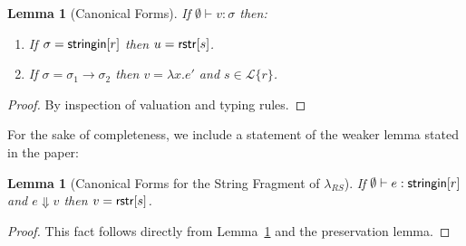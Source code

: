\documentclass[11pt,leqno]{article}
\newtheorem{trlem}[tr]{Lemma}
\newtheorem{lem}[thm]{Lemma}
\theoremstyle{definition}
\newcommand{\Lagr}{\mathcal{L}}
\newcommand{\lang}[1]{\Lagr\{#1\}}
\newcommand{\lambdas}{\lambda_{RS}}
\newcommand{\stringin}[1]{{\sf stringin}[#1]}
\newcommand{\sreduces}{ \Downarrow }
\begin{document}
\begin{trlem}[Canonical Forms]\label{cfgen}
If $\emptyset \vdash v : \sigma$ then:
\begin{enumerate}
\item If $\sigma = \stringin{r}$ then $u = {\sf rstr}[s]$.
\item If $\sigma = \sigma_1 \rightarrow \sigma_2$ then $v = \lambda x . e'$ and $s \in \lang{r}$.
\end{enumerate}

\end{trlem}
\begin{proof}
By inspection of valuation and typing rules.
\end{proof}

For the sake of completeness, we include a statement of the weaker lemma
stated in the paper:

\begin{lem}[Canonical Forms for the String Fragment of $\lambdas$]\label{thm:cfs}
  If $\emptyset \vdash e : \stringin{r}$ and $e \sreduces v$ then $v={\sf rstr}[s]$. 
\end{lem}
\begin{proof}
This fact follows directly from Lemma~\ref{cfgen} and the preservation lemma.
\end{proof}
\end{document}
